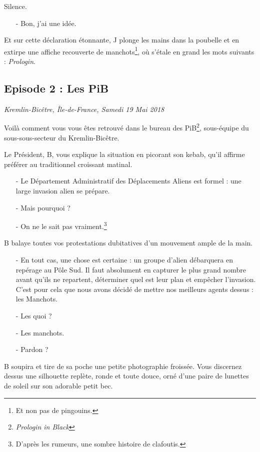 Silence.

\begin{itemize}
\item[-] Bon, j'ai une idée.
\end{itemize}

Et sur cette déclaration étonnante, J plonge les mains dans la poubelle et en
extirpe une affiche recouverte de manchots\footnote{Et non pas de pingouins.},
où s'étale en grand les mots suivants : \emph{Prologin}.

\subsection{Episode 2 : Les PiB}
\hfill \textit{Kremlin-Bicêtre, Île-de-France, Samedi 19 Mai 2018}

Voilà comment vous vous êtes retrouvé dans le bureau des
PiB\footnote{\emph{Prologin in Black}\texttrademark}, sous-équipe du
sous-sous-secteur du Kremlin-Bicêtre.

Le Président, B, vous explique la situation en picorant son kebab, qu'il affirme
préférer au traditionnel croissant matinal.

\begin{itemize}
    \item[-] Le Département Administratif des Déplacements Aliens est formel :
        une large invasion alien se prépare.
    \item[-] Mais pourquoi ?
    \item[-] On ne le sait pas vraiment.\footnote{D'après les rumeurs, une
        sombre histoire de clafoutis.}
\end{itemize}
B balaye toutes vos protestations dubitatives d'un mouvement ample de la main.
\begin{itemize}
    \item[-] En tout cas, une chose est certaine : un groupe d'alien débarquera
        en repérage au Pôle Sud. Il faut absolument en capturer le plus grand
        nombre avant qu'ils ne repartent, déterminer quel est leur plan et
        empêcher l'invasion. C'est pour cela que nous avons décidé de mettre
        nos meilleurs agents dessus : les Manchots.
    \item[-] Les quoi ?
    \item[-] Les manchots.
    \item[-] Pardon ?
\end{itemize}

B soupira et tire de sa poche une petite photographie froissée. Vous discernez
dessus une silhouette replète, ronde et toute douce, orné d'une paire de
lunettes de soleil sur son adorable petit bec.

